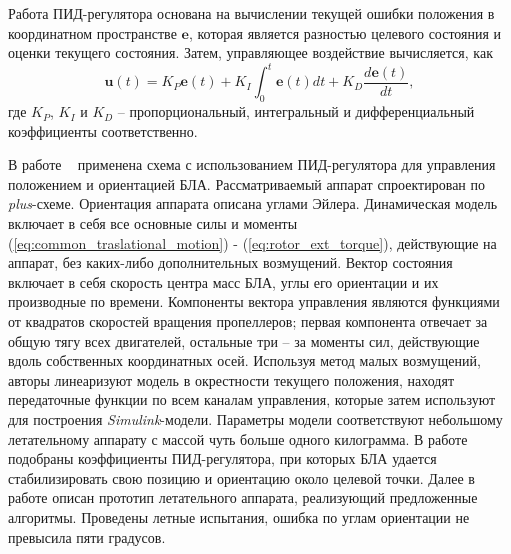 Работа ПИД-регулятора основана на вычислении текущей ошибки положения в координатном пространстве $\bm{e}$, которая является разностью целевого состояния и оценки текущего состояния. Затем, управляющее воздействие вычисляется, как
\begin{equation} \label{eq:pid_common}
\bm{u}(t) = K_P \bm{e}(t) + K_I\int_0^t \bm{e}(t) dt + K_D \frac{d\bm{e}(t)}{dt},
\end{equation}
где $K_P$, $K_I$ и $K_D$ -- пропорциональный, интегральный и дифференциальный коэффициенты соответственно.

В работе ~\cite{Li01} применена схема с использованием ПИД-регулятора для управления положением и ориентацией БЛА.
Рассматриваемый аппарат спроектирован по \textit{plus}-схеме.
Ориентация аппарата описана углами Эйлера.
Динамическая модель включает в себя все основные силы и моменты (\ref{eq:common_traslational_motion}) - (\ref{eq:rotor_ext_torque}), действующие на аппарат, без каких-либо дополнительных возмущений.
Вектор состояния включает в себя скорость центра масс БЛА, углы его ориентации и их производные по времени.
Компоненты вектора управления являются функциями от квадратов скоростей вращения пропеллеров; первая компонента отвечает за общую тягу всех двигателей, остальные три -- за моменты сил, действующие вдоль собственных координатных осей.
Используя метод малых возмущений, авторы линеаризуют модель в окрестности текущего положения, находят передаточные функции по всем каналам управления, которые затем используют для построения \textit{Simulink}-модели.
Параметры модели соответствуют небольшому летательному аппарату с массой чуть больше одного килограмма.
В работе подобраны коэффициенты ПИД-регулятора, при которых БЛА удается стабилизировать свою позицию и ориентацию около целевой точки.
Далее в работе описан прототип летательного аппарата, реализующий предложенные алгоритмы.
Проведены летные испытания, ошибка по углам ориентации не превысила пяти градусов.

